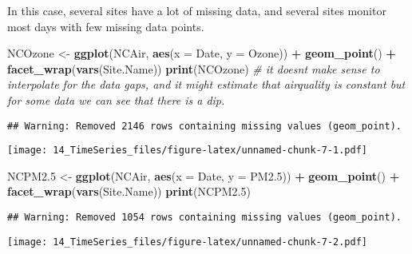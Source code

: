 \documentclass[
]{article}
\newenvironment{Shaded}{\begin{snugshade}}{\end{snugshade}}
\newcommand{\CommentTok}[1]{\textcolor[rgb]{0.56,0.35,0.01}{\textit{#1}}}
\newcommand{\DataTypeTok}[1]{\textcolor[rgb]{0.13,0.29,0.53}{#1}}
\newcommand{\FloatTok}[1]{\textcolor[rgb]{0.00,0.00,0.81}{#1}}
\newcommand{\KeywordTok}[1]{\textcolor[rgb]{0.13,0.29,0.53}{\textbf{#1}}}
\newcommand{\NormalTok}[1]{#1}
\newcommand{\OperatorTok}[1]{\textcolor[rgb]{0.81,0.36,0.00}{\textbf{#1}}}
\newcommand{\StringTok}[1]{\textcolor[rgb]{0.31,0.60,0.02}{#1}}
\begin{document}
In this case, several sites have a lot of missing data, and several
sites monitor most days with few missing data points.

\begin{Shaded}
\begin{Highlighting}[]
\NormalTok{NCOzone <{-}}
\KeywordTok{ggplot}\NormalTok{(NCAir, }\KeywordTok{aes}\NormalTok{(}\DataTypeTok{x =}\NormalTok{ Date, }\DataTypeTok{y =}\NormalTok{ Ozone)) }\OperatorTok{+}
\StringTok{  }\KeywordTok{geom\_point}\NormalTok{() }\OperatorTok{+}
\StringTok{  }\KeywordTok{facet\_wrap}\NormalTok{(}\KeywordTok{vars}\NormalTok{(Site.Name))}
\KeywordTok{print}\NormalTok{(NCOzone) }\CommentTok{\# it doesnt make sense to interpolate for the data gaps, and it might estimate that airquality is constant but for some data we can see that there is a dip.}
\end{Highlighting}
\end{Shaded}

\begin{verbatim}
## Warning: Removed 2146 rows containing missing values (geom_point).
\end{verbatim}

\texttt{[image: 14\_TimeSeries\_files/figure-latex/unnamed-chunk-7-1.pdf]}

\begin{Shaded}
\begin{Highlighting}[]
\NormalTok{NCPM2}\FloatTok{.5}\NormalTok{ <{-}}
\KeywordTok{ggplot}\NormalTok{(NCAir, }\KeywordTok{aes}\NormalTok{(}\DataTypeTok{x =}\NormalTok{ Date, }\DataTypeTok{y =}\NormalTok{ PM2}\FloatTok{.5}\NormalTok{)) }\OperatorTok{+}
\StringTok{  }\KeywordTok{geom\_point}\NormalTok{() }\OperatorTok{+}
\StringTok{  }\KeywordTok{facet\_wrap}\NormalTok{(}\KeywordTok{vars}\NormalTok{(Site.Name))}
\KeywordTok{print}\NormalTok{(NCPM2}\FloatTok{.5}\NormalTok{)}
\end{Highlighting}
\end{Shaded}

\begin{verbatim}
## Warning: Removed 1054 rows containing missing values (geom_point).
\end{verbatim}

\texttt{[image: 14\_TimeSeries\_files/figure-latex/unnamed-chunk-7-2.pdf]}

\begin{Shaded}
\end{Shaded}
\end{document}
